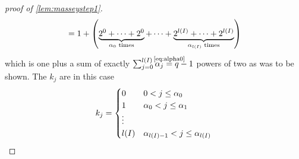 \begin{proof}[proof of \autoref{lem:masseystep1}]
\begin{align*}
    = 1 + \left(
      \underbrace{2^0 +\dotsb+ 2^0}_{\text{$\alpha_0$ times}}
      + \dotsb
      + \underbrace{2^{l(I)}+\dotsb+2^{l(I)}}_{\text{$\alpha_{l(I)}$ times}}
      \right)
  \end{align*}
  which is one plus a sum of exactly
  $\sum_{j=0}^{\l(I)}\alpha_j\cequalsby{\eqref{eq:alpha0}} q-1$
  powers of two as was to be shown.
  The $k_j$ are in this case
  \begin{gather*}
    k_j = \begin{cases}
      0 & 0< j\leq \alpha_0\\
      1 & \alpha_0< j\leq \alpha_1\\
      \vdots\\
      l(I) & \alpha_{l(I)-1}<j\leq \alpha_{l(I)}
    \end{cases}
    \qedhere
  \end{gather*}
\end{proof}

